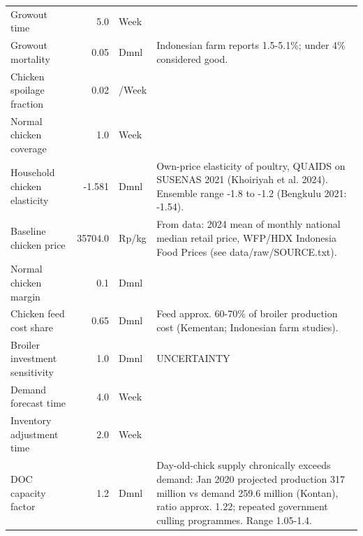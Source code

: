 \documentclass[10pt,twocolumn,a4paper]{article}
\begin{document}
\begin{longtable}{>{\raggedright\arraybackslash}p{4.2cm}r>{\raggedright\arraybackslash}p{2.4cm}>{\raggedright\arraybackslash}p{7.2cm}}
Growout time & 5.0 & Week &  \\
Growout mortality & 0.05 & Dmnl & Indonesian farm reports 1.5-5.1\%; under 4\% considered good. \\
Chicken spoilage fraction & 0.02 & 1/Week &  \\
Normal chicken coverage & 1.0 & Week &  \\
Household chicken elasticity & -1.581 & Dmnl & Own-price elasticity of poultry, QUAIDS on SUSENAS 2021 (Khoiriyah et al. 2024). Ensemble range -1.8 to -1.2 (Bengkulu 2021: -1.54). \\
Baseline chicken price & 35704.0 & Rp/kg & From data: 2024 mean of monthly national median retail price, WFP/HDX Indonesia Food Prices (see data/raw/SOURCE.txt). \\
Normal chicken margin & 0.1 & Dmnl &  \\
Chicken feed cost share & 0.65 & Dmnl & Feed approx. 60-70\% of broiler production cost (Kementan; Indonesian farm studies). \\
Broiler investment sensitivity & 1.0 & Dmnl & UNCERTAINTY \\
Demand forecast time & 4.0 & Week &  \\
Inventory adjustment time & 2.0 & Week &  \\
DOC capacity factor & 1.2 & Dmnl & Day-old-chick supply chronically exceeds demand: Jan 2020 projected production 317 million vs demand 259.6 million (Kontan), ratio approx. 1.22; repeated government culling programmes. Range 1.05-1.4. \\
\bottomrule
\end{longtable}
\normalsize
\end{document}

